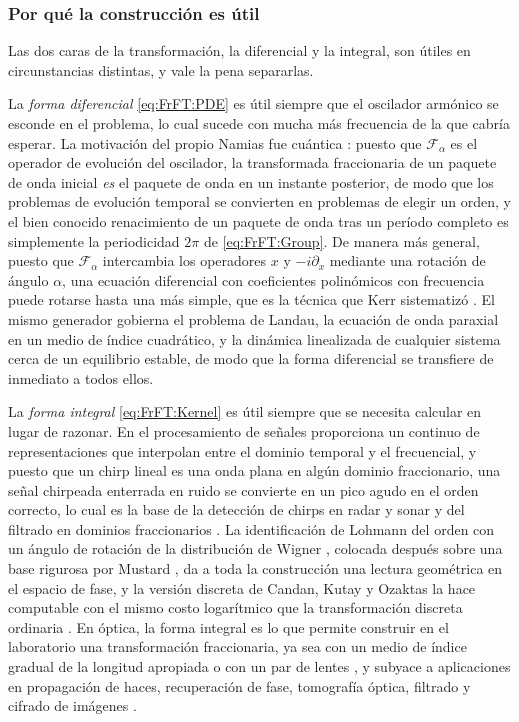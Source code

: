 		\subsubsection{Por qué la construcción es útil}

			Las dos caras de la transformación, la diferencial y la integral, son útiles en circunstancias distintas, y vale la pena separarlas.

			La \textit{forma diferencial} \eqref{eq:FrFT:PDE} es útil siempre que el oscilador armónico se esconde en el problema, lo cual sucede con mucha más frecuencia de la que cabría esperar. La motivación del propio Namias fue cuántica \citep{namias1980fractional}: puesto que $\mathcal{F}_{\alpha}$ es el operador de evolución del oscilador, la transformada fraccionaria de un paquete de onda inicial \textit{es} el paquete de onda en un instante posterior, de modo que los problemas de evolución temporal se convierten en problemas de elegir un orden, y el bien conocido renacimiento de un paquete de onda tras un período completo es simplemente la periodicidad $2\pi$ de \eqref{eq:FrFT:Group}. De manera más general, puesto que $\mathcal{F}_{\alpha}$ intercambia los operadores $x$ y $-i\partial_{x}$ mediante una rotación de ángulo $\alpha$, una ecuación diferencial con coeficientes polinómicos con frecuencia puede rotarse hasta una más simple, que es la técnica que Kerr sistematizó \citep{kerr1988namias}. El mismo generador gobierna el problema de Landau, la ecuación de onda paraxial en un medio de índice cuadrático, y la dinámica linealizada de cualquier sistema cerca de un equilibrio estable, de modo que la forma diferencial se transfiere de inmediato a todos ellos.

			La \textit{forma integral} \eqref{eq:FrFT:Kernel} es útil siempre que se necesita calcular en lugar de razonar. En el procesamiento de señales proporciona un continuo de representaciones que interpolan entre el dominio temporal y el frecuencial, y puesto que un chirp lineal es una onda plana en algún dominio fraccionario, una señal chirpeada enterrada en ruido se convierte en un pico agudo en el orden correcto, lo cual es la base de la detección de chirps en radar y sonar y del filtrado en dominios fraccionarios \citep{almeida1994fractional, sejdic2011fractional}. La identificación de Lohmann del orden con un ángulo de rotación de la distribución de Wigner \citep{lohmann1993image}, colocada después sobre una base rigurosa por Mustard \citeyearpar{mustard1996fractional}, da a toda la construcción una lectura geométrica en el espacio de fase, y la versión discreta de Candan, Kutay y Ozaktas \citeyearpar{candan2000discrete} la hace computable con el mismo costo logarítmico que la transformación discreta ordinaria \citep{cooley1965algorithm}. En óptica, la forma integral es lo que permite construir en el laboratorio una transformación fraccionaria, ya sea con un medio de índice gradual de la longitud apropiada \citep{mendlovic1993fractional, ozaktas1993fractional} o con un par de lentes \citep{lohmann1993image}, y subyace a aplicaciones en propagación de haces, recuperación de fase, tomografía óptica, filtrado y cifrado de imágenes \citep{ozaktas2001fractional}.


